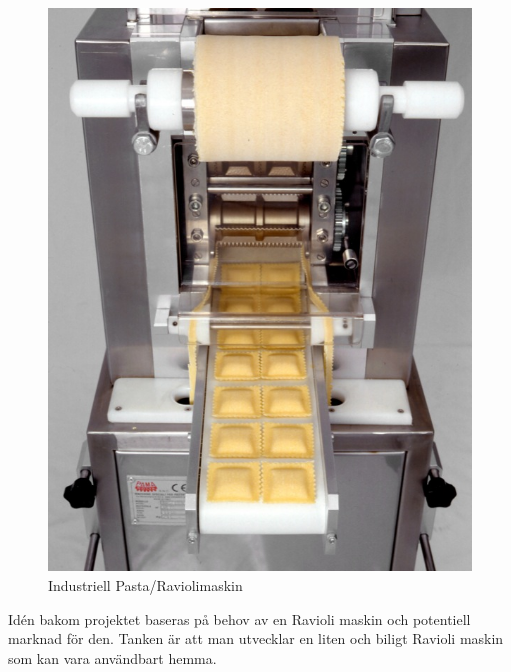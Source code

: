  		\begin{figure}[h]
 			\begin{center}
 				\includegraphics[scale=2]{images/pastamachine.jpg}
 				\caption{Industriell Pasta/Raviolimaskin}
 				\label{pastamaskin}	
 			\end{center}
 		\end{figure}

Idén bakom projektet baseras på behov av en Ravioli maskin och potentiell marknad för den. Tanken är att man utvecklar en liten och biligt Ravioli maskin som kan vara användbart hemma.		